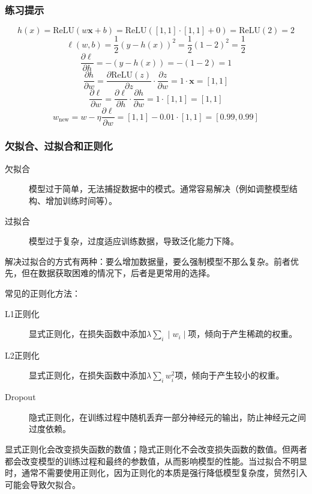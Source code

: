 \documentclass[aspectratio=1610]{ctexbeamer}
\begin{document}
\begin{frame}
    \frametitle{练习提示}

    \begin{equation}
h(x) = \text{ReLU}(w\mathbf{x} + b) = \text{ReLU}([1, 1] \cdot [1, 1] + 0) = \text{ReLU}(2) = 2
\end{equation}
\begin{equation}
\ell(w, b) = \frac{1}{2}(y - h(x))^2 = \frac{1}{2}(1 - 2)^2 = \frac{1}{2}
\end{equation}
\begin{equation}
\frac{\partial \ell}{\partial h} = -(y - h(x)) = -(1 - 2) = 1
\end{equation}
\begin{equation}
\frac{\partial h}{\partial w} = \frac{\partial \text{ReLU}(z)}{\partial z} \cdot \frac{\partial z}{\partial w} = 1 \cdot \mathbf{x} = [1, 1]
\end{equation}
\begin{equation}
\frac{\partial \ell}{\partial w} = \frac{\partial \ell}{\partial h} \cdot \frac{\partial h}{\partial w} = 1 \cdot [1, 1] = [1, 1]
\end{equation}
\begin{equation}
w_{\text{new}} = w - \eta \frac{\partial \ell}{\partial w} = [1, 1] - 0.01 \cdot [1, 1] = [0.99, 0.99]
\end{equation}

\end{frame}

\begin{frame}
    \frametitle{欠拟合、过拟合和正则化}

    \begin{description}
        \item[欠拟合] 模型过于简单，无法捕捉数据中的模式。通常容易解决（例如调整模型结构、增加训练时间等）。
        \item[过拟合] 模型过于复杂，过度适应训练数据，导致泛化能力下降。
    \end{description}

    解决过拟合的方式有两种：要么增加数据量，要么强制模型不那么复杂。前者优先，但在数据获取困难的情况下，后者是更常用的选择。

    常见的正则化方法：
    \begin{description}
        \item[L1正则化] 显式正则化，在损失函数中添加$\lambda \sum_i  \mid w_i \mid $项，倾向于产生稀疏的权重。
        \item[L2正则化] 显式正则化，在损失函数中添加$\lambda \sum_i w_i^2$项，倾向于产生较小的权重。
        \item[Dropout] 隐式正则化，在训练过程中随机丢弃一部分神经元的输出，防止神经元之间过度依赖。
    \end{description}
    显式正则化会改变损失函数的数值；隐式正则化不会改变损失函数的数值。但两者都会改变模型的训练过程和最终的参数值，从而影响模型的性能。当过拟合不明显时，通常不需要使用正则化，因为正则化的本质是强行降低模型复杂度，贸然引入可能会导致欠拟合。

\end{frame}
\end{document}
